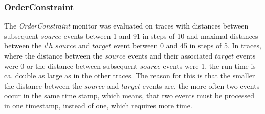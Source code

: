 \subsubsection{OrderConstraint}
The \textit{OrderConstraint} monitor was evaluated on traces with distances between subsequent $source$ events between 1 and 91 in steps of 10 and maximal distances between the $i^th$ $source$ and $target$ event between 0 and 45 in steps of 5. In traces, where the distance between the $source$ events and their associated $target$ events were 0 or the distance between subsequent $source$ events were 1, the run time is ca. double as large as in the other traces. The reason for this is that the smaller the distance between the $source$ and $target$ events are, the more often two events occur in the same time stamp, which means, that two events must be processed in one timestamp, instead of one, which requires more time.
